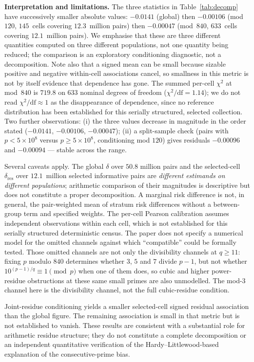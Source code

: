 \documentclass[11pt]{amsart}
\theoremstyle{definition}
\begin{document}
\textbf{Interpretation and limitations.}
The three statistics in Table~\ref{tab:decomp} have successively smaller
absolute values: $-0.0141$ (global) then $-0.00106$ (mod~$120$, $145$~cells
covering $12.3$~million pairs) then $-0.00047$ (mod~$840$, $633$~cells
covering $12.1$~million pairs). We emphasise that these are three different
quantities computed on three different populations, not one quantity being
reduced; the comparison is an exploratory conditioning diagnostic, not a
decomposition. Note also that a signed mean can be small because sizable
positive and negative within-cell associations cancel, so smallness in this
metric is not by itself evidence that dependence has gone. The summed per-cell
$\chi^2$ at mod~$840$ is $719.8$ on $633$ nominal degrees of freedom
($\chi^2/\mathrm{df} = 1.14$); we do not read $\chi^2/\mathrm{df} \approx 1$
as the disappearance of dependence, since no reference distribution has been
established for this serially structured, selected collection.
Two further observations: (i) the three values decrease in magnitude in the
order stated ($-0.0141$, $-0.00106$, $-0.00047$); (ii) a
split-sample check (pairs with $p < 5 \times 10^8$ versus
$p \ge 5 \times 10^8$, conditioning mod $120$) gives residuals
$-0.00096$ and $-0.00094$ --- stable across the range.

Several caveats apply. The global $\delta$ over $50.8$ million pairs and the
selected-cell $\delta_{\mathrm{res}}$ over $12.1$~million selected informative
pairs are \emph{different estimands on different populations}; arithmetic
comparison of their magnitudes is descriptive but does not constitute a proper
decomposition. A marginal risk difference is not, in general, the pair-weighted
mean of stratum risk differences without a between-group term and specified
weights. The per-cell Pearson calibration assumes independent observations
within each cell, which is not established for this serially structured
deterministic census. The paper does not specify a numerical model for the
omitted channels against which ``compatible'' could be formally tested. Those
omitted channels are not only the divisibility channels at $q \ge 11$:
fixing $p$ modulo $840$ determines whether $3$, $5$ and $7$ divide $p - 1$,
but not whether $10^{(p-1)/q} \equiv 1 \pmod p$ when one of them does, so
cubic and higher power-residue obstructions at these same small primes are
also unmodelled. The mod-$3$ channel here is the divisibility channel, not the
full cubic-residue condition.

Joint-residue conditioning yields a smaller selected-cell signed
residual association than the global figure. The remaining association is small in that metric but is
not established to vanish. These results are consistent with a substantial role
for arithmetic residue structure; they do not constitute a complete
decomposition or an independent quantitative verification of the
Hardy--Littlewood-based explanation of the consecutive-prime bias.
\end{document}
